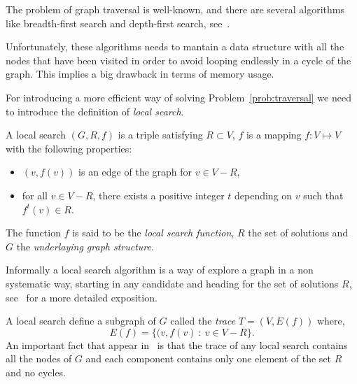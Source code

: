 \documentclass{article}
\begin{document}
The problem of graph traversal is well-known, and there are 
several algorithms like breadth-first search and depth-first
search, see~\cite[Page 597]{Cormen}. 

Unfortunately, these algorithms needs to mantain a data 
structure with all the nodes that have been visited in order to avoid
looping endlessly in a cycle of the graph. This implies a big
drawback in terms of memory usage. 
  
For introducing a more efficient way of solving
Problem~\ref{prob:traversal} we need to introduce the definition of
\textit{local search}. 
\begin{definition}
  A local search  $(G, R, f)$ is a triple satisfying $R\subset V$, $f$
  is  a mapping $f: V\mapsto V$ with the following properties:
  \begin{itemize}
  \item $(v,f(v))$ is an edge of the graph for $v\in V- R$,
  \item for all $v\in  V- R$, there exists a positive integer $t$
    depending on $v$ such
    that $f^{t}(v)\in R$.
  \end{itemize}
  The function $f$ is said to be the \textit{local search function}, 
  $R$  the set of solutions
  and $G$  the \textit{underlaying graph structure}.
\end{definition}
Informally a local search algorithm is a way of explore a
graph in a  non systematic way, starting in any candidate and heading
for the set of solutions $R$,  see~\cite[Page 110]{RussellNorvig} for
a more detailed exposition.  

A local search define a subgraph of $G$ called the \textit{trace} $T =
(V, E(f))$ where,
\begin{equation*}
  E(f) = \{(v,f(v)\ :\ v\in V- R\}.
\end{equation*}
An important fact that appear in~\cite[Property 2.1]{AvisFukuda} is
that the trace of any local search contains all the nodes of $G$ and
each component contains only one element of the set $R$ and no
cycles. 
\end{document}
